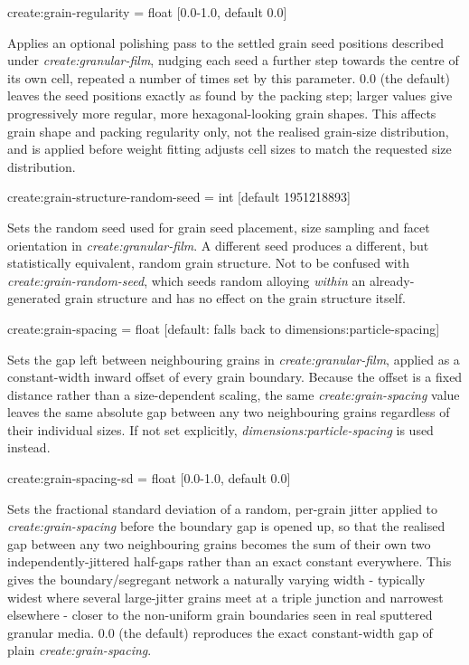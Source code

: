 {\zicf create:grain-regularity = float [0.0-1.0, default 0.0]} Applies an optional polishing pass to the settled grain seed positions described under \textit{create:granular-film}, nudging each seed a further step towards the centre of its own cell, repeated a number of times set by this parameter. 0.0 (the default) leaves the seed positions exactly as found by the packing step; larger values give progressively more regular, more hexagonal-looking grain shapes. This affects grain shape and packing regularity only, not the realised grain-size distribution, and is applied before weight fitting adjusts cell sizes to match the requested size distribution.

{\zicf create:grain-structure-random-seed = int [default 1951218893]} Sets the random seed used for grain seed placement, size sampling and facet orientation in \textit{create:granular-film}. A different seed produces a different, but statistically equivalent, random grain structure. Not to be confused with \textit{create:grain-random-seed}, which seeds random alloying \emph{within} an already-generated grain structure and has no effect on the grain structure itself.

{\zicf create:grain-spacing = float [default: falls back to dimensions:particle-spacing]} Sets the gap left between neighbouring grains in \textit{create:granular-film}, applied as a constant-width inward offset of every grain boundary. Because the offset is a fixed distance rather than a size-dependent scaling, the same \textit{create:grain-spacing} value leaves the same absolute gap between any two neighbouring grains regardless of their individual sizes. If not set explicitly, \textit{dimensions:particle-spacing} is used instead.

{\zicf create:grain-spacing-sd = float [0.0-1.0, default 0.0]} Sets the fractional standard deviation of a random, per-grain jitter applied to \textit{create:grain-spacing} before the boundary gap is opened up, so that the realised gap between any two neighbouring grains becomes the sum of their own two independently-jittered half-gaps rather than an exact constant everywhere. This gives the boundary/segregant network a naturally varying width - typically widest where several large-jitter grains meet at a triple junction and narrowest elsewhere - closer to the non-uniform grain boundaries seen in real sputtered granular media. 0.0 (the default) reproduces the exact constant-width gap of plain \textit{create:grain-spacing}.

